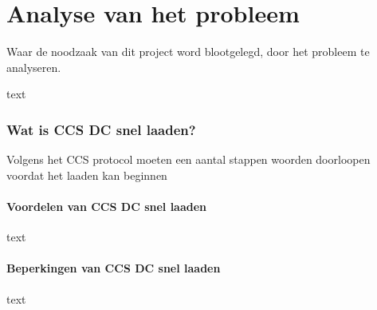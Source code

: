 \chapter{Analyse van het probleem}
\label{Analyse_van_het_probleem}

\begin{center}
    \begin{minipage}{0.5\textwidth}
        \begin{small}
            Waar de noodzaak van dit project word blootgelegd, door het probleem te analyseren.
        \end{small} 
    \end{minipage}
    \vspace{0.5cm}
\end{center}

text

\subsection{Wat is CCS DC snel laaden?}

Volgens het CCS protocol moeten een aantal stappen woorden doorloopen voordat het laaden kan beginnen


\subsubsection{Voordelen van CCS DC snel laaden}

text

\subsubsection{Beperkingen van CCS DC snel laaden}

text
